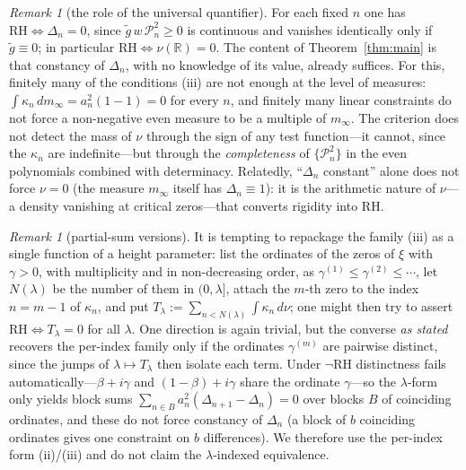 \documentclass[11pt]{amsart}
\theoremstyle{definition}
\theoremstyle{remark}
\newtheorem{remark}[theorem]{Remark}
\newcommand{\RH}{\mathrm{RH}}
\newcommand{\bbR}{\mathbb{R}}
\newcommand{\minf}{m_\infty}
\begin{document}
\begin{remark}[the role of the universal quantifier]\label{rem:quantifier}
For each fixed $n$ one has $\RH\iff\Delta_n=0$, since $\tilde g\,w\,\mathcal
P_n^2\ge0$ is continuous and vanishes identically only if $\tilde g\equiv0$;
in particular $\RH\iff\nu(\bbR)=0$. The content of Theorem~\ref{thm:main} is
that constancy of $\Delta_n$, with no knowledge of its value, already
suffices. For this, finitely many of the conditions (iii) are not enough at
the level of measures: $\int\kappa_n\,d\minf=a_n^{2}(1-1)=0$ for every $n$,
and finitely many linear constraints do not force a non-negative even
measure to be a multiple of $\minf$. The
criterion does not detect the mass of $\nu$ through the sign of any test
function---it cannot, since the $\kappa_n$ are indefinite---but through the
\emph{completeness} of $\{\mathcal P_n^{2}\}$ in the even polynomials
combined with determinacy. Relatedly, ``$\Delta_n$ constant'' alone does not
force $\nu=0$ (the measure $\minf$ itself has $\Delta_n\equiv1$): it is the
arithmetic nature of $\nu$---a density vanishing at critical zeros---that
converts rigidity into RH.
\end{remark}

\begin{remark}[partial-sum versions]\label{rem:partialsums}
It is tempting to repackage the family (iii) as a single function of a
height parameter: list the ordinates of the zeros of $\xi$ with
$\gamma>0$, with multiplicity and in non-decreasing order, as
$\gamma^{(1)}\le\gamma^{(2)}\le\cdots$, let $N(\lambda)$ be the number of
them in $(0,\lambda]$, attach the $m$-th zero to the index $n=m-1$ of
$\kappa_n$, and put
$T_\lambda:=\sum_{n<N(\lambda)}\int\kappa_n\,d\nu$; one might then try to assert $\RH\iff T_\lambda=0$ for all $\lambda$. One direction
is again trivial, but the converse \emph{as stated} recovers the per-index
family only if the ordinates $\gamma^{(m)}$ are pairwise distinct, since the
jumps of $\lambda\mapsto T_\lambda$ then isolate each term. Under $\neg\RH$
distinctness fails automatically---$\beta+i\gamma$ and $(1-\beta)+i\gamma$
share the ordinate $\gamma$---so the $\lambda$-form only yields block sums
$\sum_{n\in B}a_n^{2}(\Delta_{n+1}-\Delta_n)=0$ over blocks $B$ of
coinciding ordinates, and these do not force constancy of $\Delta_n$ (a
block of $b$ coinciding ordinates gives one constraint on $b$ differences).
We therefore use the per-index form (ii)/(iii) and do not claim the
$\lambda$-indexed equivalence.
\end{remark}
\end{document}
